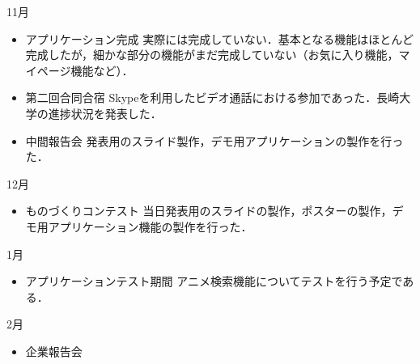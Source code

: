 11月
\begin{itemize}
\item アプリケーション完成
実際には完成していない．基本となる機能はほとんど完成したが，細かな部分の機能がまだ完成していない（お気に入り機能，マイページ機能など）．
\item 第二回合同合宿
Skypeを利用したビデオ通話における参加であった．長崎大学の進捗状況を発表した．
\item 中間報告会
発表用のスライド製作，デモ用アプリケーションの製作を行った．
\end{itemize}
12月
\begin{itemize}
\item ものづくりコンテスト
当日発表用のスライドの製作，ポスターの製作，デモ用アプリケーション機能の製作を行った．
\end{itemize}
1月
\begin{itemize}
\item アプリケーションテスト期間
アニメ検索機能についてテストを行う予定である．
\end{itemize}
2月
\begin{itemize}
\item 企業報告会
\end{itemize}
